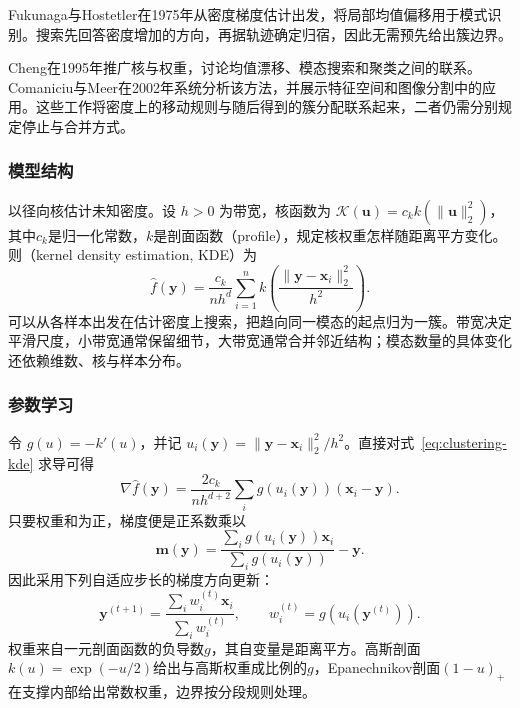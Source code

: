 \Needspace{125mm}
Fukunaga与Hostetler在1975年从密度梯度估计出发，将局部均值偏移用于模式识别。搜索先回答密度增加的方向，再据轨迹确定归宿，因此无需预先给出簇边界。

Cheng在1995年推广核与权重，讨论均值漂移、模态搜索和聚类之间的联系。Comaniciu与Meer在2002年系统分析该方法，并展示特征空间和图像分割中的应用。这些工作将密度上的移动规则与随后得到的簇分配联系起来，二者仍需分别规定停止与合并方式。

\subsubsection{模型结构}

以径向核估计未知密度。设 $h>0$ 为带宽，核函数为 $\mathcal{K}(\bm{u})=c_k k(\lVert\bm{u}\rVert_2^2)$，其中$c_k$是归一化常数，$k$是剖面函数（profile），规定核权重怎样随距离平方变化。则（kernel density estimation, KDE）为
\begin{equation}
 \hat f(\bm{y})=\frac{c_k}{nh^d}
 \sum_{i=1}^n
 k\left(\frac{\lVert\bm{y}-\bm{x}_i\rVert_2^2}{h^2}\right).
 \label{eq:clustering-kde}
\end{equation}
可以从各样本出发在估计密度上搜索，把趋向同一模态的起点归为一簇。带宽决定平滑尺度，小带宽通常保留细节，大带宽通常合并邻近结构；模态数量的具体变化还依赖维数、核与样本分布。

\subsubsection{参数学习}

令 $g(u)=-k'(u)$，并记 $u_i(\bm{y})=\lVert\bm{y}-\bm{x}_i\rVert_2^2/h^2$。直接对式~\eqref{eq:clustering-kde} 求导可得
\[
 \nabla\hat f(\bm{y})=
 \frac{2c_k}{nh^{d+2}}
 \sum_i g(u_i(\bm{y}))(\bm{x}_i-\bm{y}).
\]
只要权重和为正，梯度便是正系数乘以
\[
 \bm{m}(\bm{y})=
 \frac{\sum_i g(u_i(\bm{y}))\bm{x}_i}
      {\sum_i g(u_i(\bm{y}))}-\bm{y}.
\]
因此采用下列自适应步长的梯度方向更新：
\begin{equation}
 \bm{y}^{(t+1)}=
 \frac{\sum_i w_i^{(t)}\bm{x}_i}{\sum_i w_i^{(t)}},
 \qquad w_i^{(t)}=g(u_i(\bm{y}^{(t)})).
 \label{eq:clustering-mean-shift}
\end{equation}
权重来自一元剖面函数的负导数$g$，其自变量是距离平方。高斯剖面$k(u)=\exp(-u/2)$给出与高斯权重成比例的$g$，Epanechnikov剖面$(1-u)_+$在支撑内部给出常数权重，边界按分段规则处理。

